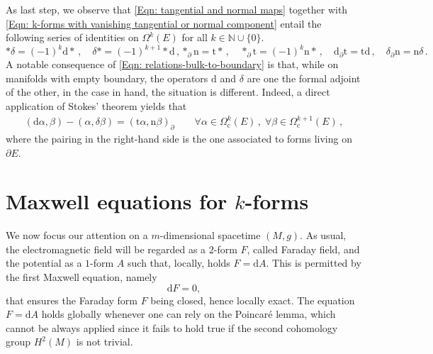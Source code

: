 \noindent As last step, we observe that \eqref{Eqn: tangential and normal maps} together with \eqref{Eqn: k-forms with vanishing tangential or normal component} entail the following series of identities on $\Omega^k(E)$ for all $k\in\mathbb{N}\cup\{0\}$.
\begin{subequations}\label{Eqn: relations between d,delta,t,n}
	\begin{equation}\label{Eqn: relations-bulk}
	\ast\delta=(-1)^k\mathrm{d}\ast\,,\quad
	\delta\ast=(-1)^{k+1}\ast\mathrm{d}\,,
	\end{equation}
	\begin{equation}\label{Eqn: relations-bulk-to-boundary}
	\ast_\partial\mathrm{n}=\mathrm{t}\ast\,,\quad
	\ast_\partial\mathrm{t}=(-1)^k\mathrm{n}\ast\,,\quad
	\mathrm{d}_\partial\mathrm{t}=\mathrm{t}\mathrm{d}\,,\quad
	\delta_\partial\mathrm{n}=\mathrm{n}\delta\,.
	\end{equation}
\end{subequations}
A notable consequence of \eqref{Eqn: relations-bulk-to-boundary} is that, while on manifolds with empty boundary, the operators $\mathrm{d}$ and $\delta$ are one the formal adjoint of the other, in the case in hand, the situation is different. Indeed, a direct application of Stokes' theorem yields that 
\begin{align}\label{Eqn: boundary terms for delta and d}
(\mathrm{d}\alpha,\beta)-(\alpha,\delta\beta)=
(\mathrm{t}\alpha,\mathrm{n}\beta)_\partial\qquad
\forall\alpha\in\Omega_{\mathrm{c}}^k(E)\,,\;
\forall\beta\in\Omega_{\mathrm{c}}^{k+1}(E)\,,
\end{align}
where the pairing in the right-hand side is the one associated to forms living on $\partial E$.

\section{Maxwell equations for $k$-forms}\label{Sec: Maxwell introduction}
We now focus our attention on a $m$-dimensional spacetime $(M,g)$.
As usual, the electromagnetic field will be regarded as a $2$-form $F$, called Faraday field, and the potential as a $1$-form $A$ such that, locally, holds $F=\mathrm{d}A$. This is permitted by the first Maxwell equation, namely
\begin{equation}\label{Eqn: first maxwell}
	\mathrm{d}F=0,
\end{equation}
that ensures the Faraday form $F$ being closed, hence locally exact. The equation $F=\mathrm{d}A$ holds globally whenever one can rely on the Poincaré lemma, which cannot be always applied since it fails to hold true if the second cohomology group $H^2 (M )$ is not trivial.\\

